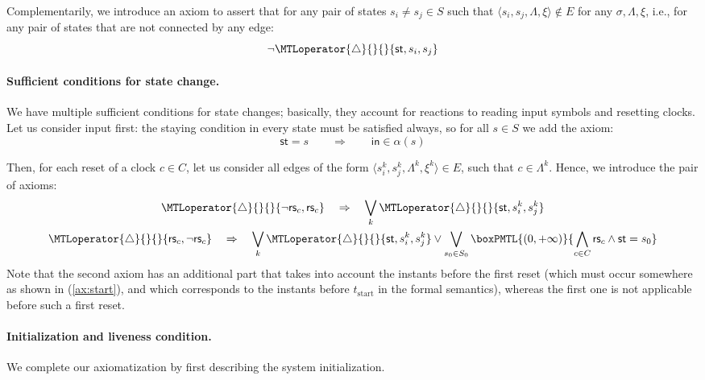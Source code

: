 \documentclass[a4paper]{article}
\newcommand{\tstart}{t_{\mathrm{start}}}
\newcommand{\frf}[1]{(\ref{#1})}
\newcommand{\st}{\mathsf{st}}
\newcommand{\inpt}{\mathsf{in}}
\newcommand{\rest}[1]{\mathsf{rs}_{#1}}
\newcommand{\becomesMTL}[1]{\MTLoperator{\triangle}{}{}{#1}}
\theoremstyle{plain}
\theoremstyle{definition}
\begin{document}
Complementarily, we introduce an axiom to assert that for any pair of states $s_i \neq s_j \in S$ such that $\langle s_i, s_j, \Lambda, \xi \rangle \not\in E$ for any $\sigma, \Lambda, \xi$, i.e., for any pair of states that are not connected by any edge:
\begin{equation} \label{ax:si2sjforbidden}
  \neg \becomesMTL{\st, s_i, s_j}
\end{equation}

\paragraph{Sufficient conditions for state change.}
We have multiple sufficient conditions for state changes; basically, they account for reactions to reading input symbols and resetting clocks.
Let us consider input first: the staying condition in every state must be satisfied always, so for all $s \in S$ we add the axiom:
\begin{equation} \label{ax:invariance}
  \st = s \qquad \Rightarrow \qquad \inpt \in \alpha(s)
\end{equation}


Then, for each reset of a clock $c \in C$, let us consider all edges of the form $\langle s_i^k, s_j^k, \Lambda^k, \xi^k \rangle \in E$, such that $c \in \Lambda^k$.
Hence, we introduce the pair of axioms:
\begin{gather} 
  \becomesMTL{\neg \rest{c}, \rest{c}} \quad \Rightarrow \quad 
       \bigvee_k \becomesMTL{\st, s_i^k, s_j^k} \nonumber \\
  \becomesMTL{\rest{c}, \neg \rest{c}} \quad \Rightarrow \quad 
       \bigvee_k \becomesMTL{\st, s_i^k, s_j^k}  \vee \bigvee_{s_0 \in S_0} \boxPMTL{(0, +\infty)}{\bigwedge_{c \in C} \rest{c} \wedge \st = s_0} \label{ax:restc}
\end{gather}
Note that the second axiom has an additional part that takes into account the instants before the first reset (which must occur somewhere as shown in \frf{ax:start}, and which corresponds to the instants before $\tstart$ in the formal semantics), whereas the first one is not applicable before such a first reset.





\paragraph{Initialization and liveness condition.}
We complete our axiomatization by first describing the system initialization.
\end{document}
